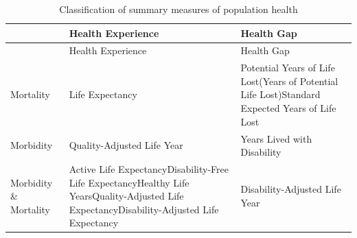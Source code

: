 \documentclass[]{book}
\begin{document}
\begin{longtable}[]{@{}lll@{}}
\caption{\label{tab:smph} Classification of summary measures of population
health}\tabularnewline
\toprule
\begin{minipage}[b]{0.08\columnwidth}\raggedright\strut
\strut
\end{minipage} & \begin{minipage}[b]{0.50\columnwidth}\raggedright\strut
Health Experience\strut
\end{minipage} & \begin{minipage}[b]{0.34\columnwidth}\raggedright\strut
Health Gap\strut
\end{minipage}\tabularnewline
\midrule
\endfirsthead
\toprule
\begin{minipage}[b]{0.08\columnwidth}\raggedright\strut
\strut
\end{minipage} & \begin{minipage}[b]{0.50\columnwidth}\raggedright\strut
Health Experience\strut
\end{minipage} & \begin{minipage}[b]{0.34\columnwidth}\raggedright\strut
Health Gap\strut
\end{minipage}\tabularnewline
\midrule
\endhead
\begin{minipage}[t]{0.08\columnwidth}\raggedright\strut
Mortality\strut
\end{minipage} & \begin{minipage}[t]{0.50\columnwidth}\raggedright\strut
Life Expectancy\strut
\end{minipage} & \begin{minipage}[t]{0.34\columnwidth}\raggedright\strut
Potential Years of Life Lost(Years of Potential Life Lost)Standard
Expected Years of Life Lost\strut
\end{minipage}\tabularnewline
\begin{minipage}[t]{0.08\columnwidth}\raggedright\strut
Morbidity\strut
\end{minipage} & \begin{minipage}[t]{0.50\columnwidth}\raggedright\strut
Quality-Adjusted Life Year\strut
\end{minipage} & \begin{minipage}[t]{0.34\columnwidth}\raggedright\strut
Years Lived with Disability\strut
\end{minipage}\tabularnewline
\begin{minipage}[t]{0.08\columnwidth}\raggedright\strut
Morbidity \& Mortality\strut
\end{minipage} & \begin{minipage}[t]{0.50\columnwidth}\raggedright\strut
Active Life ExpectancyDisability-Free Life ExpectancyHealthy Life
YearsQuality-Adjusted Life ExpectancyDisability-Adjusted Life
Expectancy\strut
\end{minipage} & \begin{minipage}[t]{0.34\columnwidth}\raggedright\strut
Disability-Adjusted Life Year\strut
\end{minipage}\tabularnewline
\bottomrule
\end{longtable}
\end{document}
